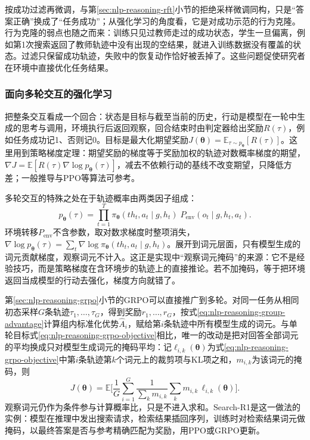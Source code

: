 按成功过滤再微调，与第\ref{sec:nlp-reasoning-rft}小节的拒绝采样微调同构，只是“答案正确”换成了“任务成功”；从强化学习的角度看，它是对成功示范的行为克隆。行为克隆的弱点也随之而来：训练只见过教师走过的成功状态，学生一旦偏离，例如第1次搜索返回了教师轨迹中没有出现的空结果，就进入训练数据没有覆盖的状态。过滤只保留成功轨迹，失败中的恢复动作恰好被丢掉了。这些问题促使研究者在环境中直接优化任务结果。

\subsubsection{面向多轮交互的强化学习}
\label{sec:nlp-execution-agent-rl}

把整条交互看成一个回合：状态是目标与截至当前的历史，行动是模型在一轮中生成的思考与调用，环境执行后返回观察，回合结束时由判定器给出奖励$R(\tau)$，例如任务成功记1、否则记0。目标是最大化期望奖励$J(\bm{\theta})=\mathbb{E}_{\tau\sim p_{\bm{\theta}}}[R(\tau)]$。这里用到策略梯度定理：期望奖励的梯度等于奖励加权的轨迹对数概率梯度的期望，$\nabla J=\mathbb{E}[R(\tau)\nabla\log p_{\bm{\theta}}(\tau)]$，减去不依赖行动的基线不改变期望，只降低方差；一般推导与PPO等算法可参考。

多轮交互的特殊之处在于轨迹概率由两类因子组成：
\begin{equation}
 p_{\bm{\theta}}(\tau)=\prod_{t=1}^{T}\pi_{\bm{\theta}}(\mathit{th}_t,a_t\mid g,h_t)\;P_{\mathrm{env}}(o_t\mid g,h_t,a_t).
 \label{eq:nlp-execution-trajectory-prob}
\end{equation}
环境转移$P_{\mathrm{env}}$不含参数，取对数求梯度时整项消失，$\nabla\log p_{\bm{\theta}}(\tau)=\sum_t\nabla\log\pi_{\bm{\theta}}(\mathit{th}_t,a_t\mid g,h_t)$。展开到词元层面，只有模型生成的词元贡献梯度，观察词元不计入。这正是实现中“观察词元掩码”的来源：它不是经验技巧，而是策略梯度在含环境步的轨迹上的直接推论。若不加掩码，等于把环境返回当成模型的行动去强化，梯度方向就错了。

第\ref{sec:nlp-reasoning-grpo}小节的GRPO可以直接推广到多轮。对同一任务从相同初态采样$G$条轨迹$\tau_1,\ldots,\tau_G$，得到奖励$r_1,\ldots,r_G$，按式\eqref{eq:nlp-reasoning-group-advantage}计算组内标准化优势$\widehat A_i$，赋给第$i$条轨迹中所有模型生成的词元。与单轮目标式\eqref{eq:nlp-reasoning-grpo-objective}相比，唯一的改动是把对回答全部词元的平均换成只对模型生成词元的掩码平均：记$\ell_{i,k}(\bm{\theta})$为式\eqref{eq:nlp-reasoning-grpo-objective}中第$i$条轨迹第$k$个词元上的裁剪项与KL项之和，$m_{i,k}$为该词元的掩码，则
\begin{equation}
 J(\bm{\theta})=\mathbb{E}\Biggl[\frac{1}{G}\sum_{i=1}^{G}\frac{1}{\sum_k m_{i,k}}\sum_{k}m_{i,k}\,\ell_{i,k}(\bm{\theta})\Biggr].
 \label{eq:nlp-execution-multiturn-grpo}
\end{equation}
观察词元仍作为条件参与计算概率比，只是不进入求和。Search-R1是这一做法的实例：模型在推理中发出搜索请求，检索结果插回序列，训练时对检索结果词元做掩码，以最终答案是否与参考精确匹配为奖励，用PPO或GRPO更新。

